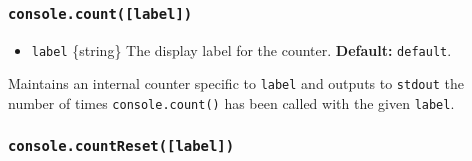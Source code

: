 \subsubsection{\texorpdfstring{\texttt{console.count({[}label{]})}}{console.count({[}label{]})}}\label{console.countlabel}

\begin{itemize}
\tightlist
\item
  \texttt{label} \{string\} The display label for the counter.
  \textbf{Default:}
  \texttt{\textquotesingle{}default\textquotesingle{}}.
\end{itemize}

Maintains an internal counter specific to \texttt{label} and outputs to
\texttt{stdout} the number of times \texttt{console.count()} has been
called with the given \texttt{label}.

\begin{Shaded}
\begin{Highlighting}[]
\OperatorTok{\textgreater{}} \NormalTok{()}
\OperatorTok{:} 
\OperatorTok{\textgreater{}} \NormalTok{(}\NormalTok{)}
\OperatorTok{:} 
\OperatorTok{\textgreater{}} \NormalTok{(}\NormalTok{)}
\OperatorTok{:} 
\OperatorTok{\textgreater{}} \NormalTok{(}\NormalTok{)}
\OperatorTok{:} 
\OperatorTok{\textgreater{}} \NormalTok{(}\NormalTok{)}
\OperatorTok{:} 
\OperatorTok{\textgreater{}} \NormalTok{()}
\OperatorTok{:} 
\OperatorTok{\textgreater{}}
\end{Highlighting}
\end{Shaded}

\subsubsection{\texorpdfstring{\texttt{console.countReset({[}label{]})}}{console.countReset({[}label{]})}}\label{console.countresetlabel}

